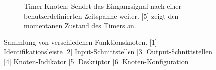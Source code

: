 \begin{figure}[H]
\begin{subfigure}{.5\textwidth}
  \caption{Timer-Knoten: Sendet das Eingangsignal nach einer benutzerdefinierten Zeitspanne weiter. [5] zeigt den momentanen Zustand des Timers an.}
  \label{fig:functimer}
\end{subfigure}

    \caption{Sammlung von verschiedenen Funktionsknoten. [1] Identifikationsleiste [2] Input-Schnittstellen [3] Output-Schnittstellen [4] Knoten-Indikator [5] Deskriptor [6] Knoten-Konfiguration}
    \label{fig:functionnodestypes}
\end{figure}